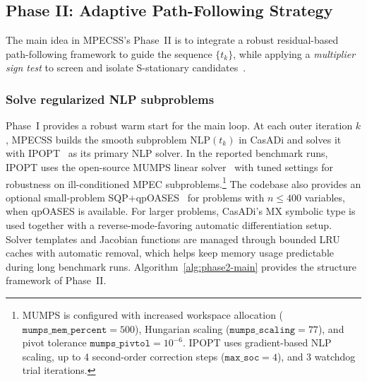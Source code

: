 \subsection{Phase II: Adaptive Path-Following Strategy}
\label{sec:adaptive_strategy}
The main idea in MPECSS's Phase~II is to integrate a robust residual-based 
path-following framework to guide the sequence $\{t_k\}$, while applying a
\emph{multiplier sign test} to screen and isolate S-stationary candidates~\cite{ScheelScholtes2000}. 

\subsubsection{Solve regularized NLP subproblems}
\label{sec:solveRegNLPs}
Phase~I provides a robust warm start for the main loop. At each outer
iteration $k$, MPECSS builds the smooth subproblem $\text{NLP}(t_k)$
in CasADi and solves it with IPOPT~\cite{WachterBiegler2006} as its
primary NLP solver. In the reported benchmark runs, IPOPT uses the
open-source MUMPS linear solver~\cite{Amestoy2001} with tuned settings
for robustness on ill-conditioned MPEC subproblems.\footnote{%
  MUMPS is configured with increased workspace allocation
  ($\texttt{mumps\_mem\_percent}=500$), Hungarian scaling
  ($\texttt{mumps\_scaling}=77$), and pivot tolerance
  $\texttt{mumps\_pivtol}=10^{-6}$. IPOPT uses gradient-based NLP
  scaling, up to 4 second-order correction steps
  ($\texttt{max\_soc}=4$), and 3 watchdog trial iterations.}
The codebase also provides an optional small-problem
SQP$+$qpOASES~\cite{Ferreau2014qpOASES} for problems with
$n \leq 400$ variables, when qpOASES is available. %
For larger problems, CasADi's MX symbolic type is used together with a reverse-mode-favoring automatic differentiation setup. Solver templates and Jacobian functions are managed through bounded LRU caches with automatic removal, which helps keep memory usage predictable during long benchmark runs. Algorithm~\ref{alg:phase2-main} provides the structure framework of Phase~II.

